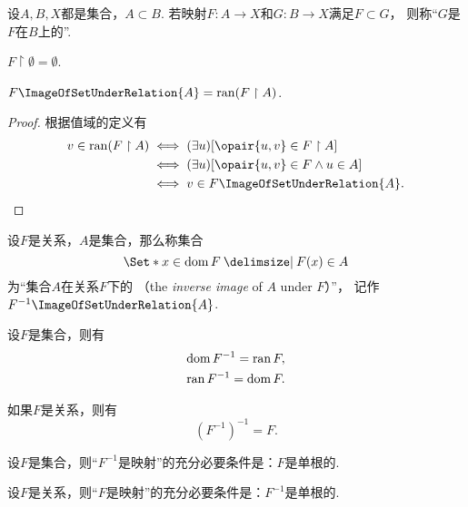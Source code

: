 \begin{definition}
设\(A,B,X\)都是集合，\(A \subset B\).
若映射\(F\colon A \to X\)和\(G\colon B \to X\)满足\(F \subset G\)，
则称“\(G\)是\(F\)在\(B\)上的”.
\end{definition}

\begin{theorem}
\(F \upharpoonright \emptyset = \emptyset\).
\end{theorem}

\begin{theorem}
\(F\ImageOfSetUnderRelation{A} = \ran(F \upharpoonright A)\).
\begin{proof}
根据值域的定义有\begin{align*}
	v \in \ran(F \upharpoonright A)
	&\iff
	(\exists u)[\opair{u,v} \in F \upharpoonright A] \\
	&\iff
	(\exists u)[\opair{u,v} \in F \land u \in A] \\
	&\iff
	v \in F\ImageOfSetUnderRelation{A}.
	\qedhere
\end{align*}
\end{proof}
\end{theorem}

\begin{definition}
设\(F\)是关系，\(A\)是集合，那么称集合\[
	\Set*{ x \in \dom F \given F(x) \in A }
\]为“集合\(A\)在关系\(F\)下的%
（the \emph{inverse image} of \(A\) under \(F\)）”，
记作\(F^{-1}\ImageOfSetUnderRelation{A}\).
\end{definition}

\begin{theorem}\label{theorem:集合论.关系的逆的定义域值域以及关系的二重逆}
设\(F\)是集合，则有\begin{gather}
	\operatorname{dom} F^{-1} = \operatorname{ran} F, \\
	\operatorname{ran} F^{-1} = \operatorname{dom} F.
\end{gather}

如果\(F\)是关系，则有\begin{equation}
	(F^{-1})^{-1} = F.
\end{equation}
\end{theorem}

\begin{theorem}\label{theorem:集合论.关系及其逆是映射的充分必要条件}
设\(F\)是集合，则“\(F^{-1}\)是映射”的充分必要条件是：\(F\)是单根的.

设\(F\)是关系，则“\(F\)是映射”的充分必要条件是：\(F^{-1}\)是单根的.
\end{theorem}

